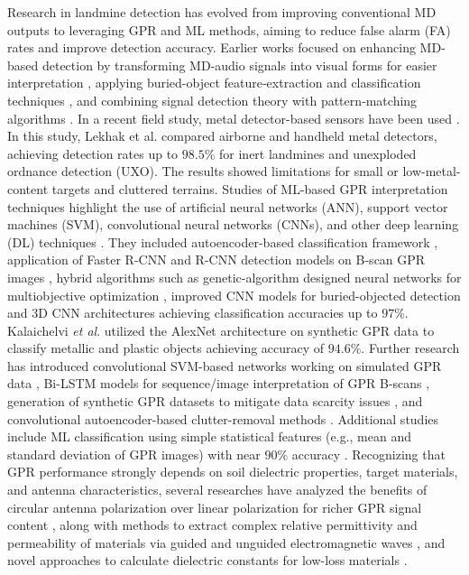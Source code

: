 \documentclass{ieeeaccess}
\begin{document}
Research in landmine detection has evolved from improving conventional MD outputs to leveraging GPR and ML methods, aiming to reduce false alarm (FA) rates and improve detection accuracy. Earlier works focused on enhancing MD-based detection by transforming MD‑audio signals into visual forms for easier interpretation \cite{Kaneko2014}, applying buried-object feature‑extraction and classification techniques \cite{Kruuger2008}, and combining signal detection theory with pattern‑matching algorithms \cite{Collins2000, Tran2012}. In a recent field study, metal detector-based sensors have been used \cite{Lekhak2024}. In this study, Lekhak et al. compared airborne and handheld metal detectors, achieving detection rates up to $98.5\%$ for inert landmines and unexploded ordnance detection (UXO). The results showed limitations for small or low-metal-content targets and cluttered terrains. 
Studies of ML-based GPR interpretation techniques highlight the use of artificial neural networks (ANN), support vector machines (SVM), convolutional neural networks (CNNs), and other deep learning (DL) techniques \cite{Pinar2015}. They included autoencoder-based classification framework \cite{Picetti2018}, application of Faster R-CNN and R-CNN detection models on B-scan GPR images \cite{Pham2018, Kafedziski2018}, hybrid algorithms such as genetic-algorithm designed neural networks for multiobjective optimization \cite{Harkat2019}, improved CNN models for buried-objected detection \cite{Xiang2019} and 3D CNN architectures achieving classification accuracies up to $97\%$. Kalaichelvi \textit{et al}. \cite{Kalaichelvi2025} utilized the AlexNet architecture on synthetic GPR data to classify metallic and plastic objects achieving accuracy of $94.6\%$. 
Further research has introduced convolutional SVM-based networks working on simulated GPR data \cite{Ozkaya2020}, Bi-LSTM models for sequence/image interpretation of GPR B-scans \cite{Ozkaya2021}, generation of synthetic GPR datasets to mitigate data scarcity issues \cite{Warren2021}, and convolutional autoencoder-based clutter-removal methods \cite{Temlioglu2021}.  Additional studies include ML classification using simple statistical features (e.g., mean and standard deviation of GPR images) with near $90\%$ accuracy \cite{Smitha2020}. Recognizing that GPR performance strongly depends on soil dielectric properties, target materials, and antenna characteristics, several researches have analyzed the benefits of circular antenna polarization over linear polarization for richer GPR signal content \cite{Takach2016}, along with methods to extract complex relative permittivity and permeability of materials via guided and unguided electromagnetic waves \cite{Shwaykani2018}, and novel approaches to calculate dielectric constants for low-loss materials \cite{Shwaykani2020}. 
\end{document}
